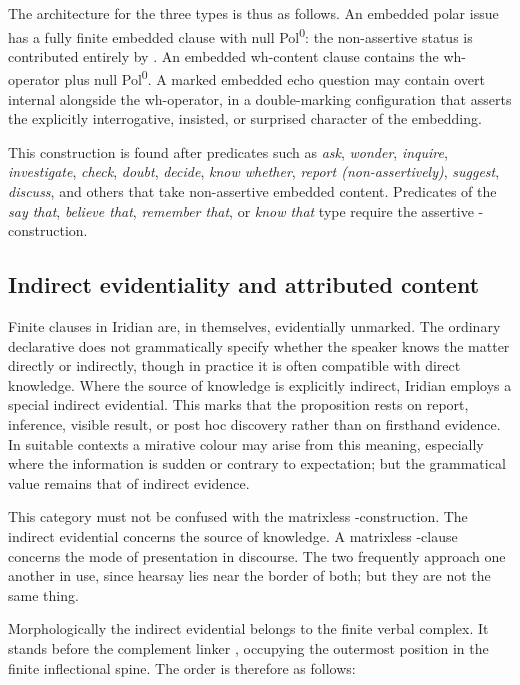 The architecture for the three types is thus as follows. An embedded polar
issue has a fully finite embedded clause with null Pol\textsuperscript{0}: the
non-assertive status is contributed entirely by . An embedded
wh-content clause contains the wh-operator plus null Pol\textsuperscript{0}.
A marked embedded echo question may contain overt internal  alongside
the wh-operator, in a double-marking configuration that asserts the explicitly
interrogative, insisted, or surprised character of the embedding.

\noindent This construction is found after predicates such as \textit{ask},
\textit{wonder}, \textit{inquire}, \textit{investigate}, \textit{check},
\textit{doubt}, \textit{decide}, \textit{know whether}, \textit{report
(non-assertively)}, \textit{suggest}, \textit{discuss}, and others that
take non-assertive embedded content. Predicates of the \textit{say that},
\textit{believe that}, \textit{remember that}, or \textit{know that} type
require the assertive -construction.

\subsection{Indirect evidentiality and attributed content}

Finite clauses in Iridian are, in themselves, evidentially unmarked. The
ordinary declarative does not grammatically specify whether the speaker knows
the matter directly or indirectly, though in practice it is often compatible
with direct knowledge. Where the source of knowledge is explicitly indirect,
Iridian employs a special indirect evidential. This marks that the
proposition rests on report, inference, visible result, or post hoc
discovery rather than on firsthand evidence. In suitable contexts a mirative
colour may arise from this meaning, especially where the information is
sudden or contrary to expectation; but the grammatical value remains that of
indirect evidence.

This category must not be confused with the matrixless -construction.
The indirect evidential concerns the source of knowledge. A matrixless
-clause concerns the mode of presentation in discourse. The two
frequently approach one another in use, since hearsay lies near the border of
both; but they are not the same thing.

Morphologically the indirect evidential belongs to the finite verbal complex.
It stands before the complement linker , occupying the outermost
position in the finite inflectional spine. The order is therefore as follows:

